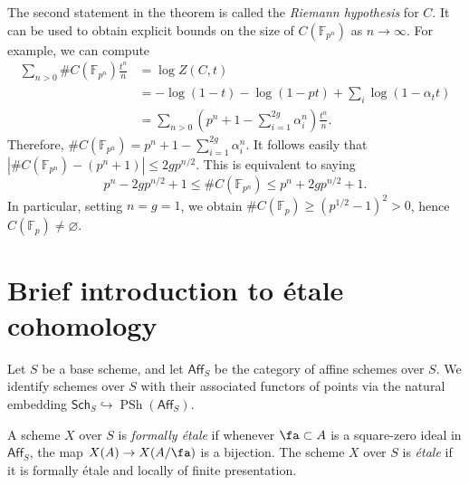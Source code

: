 \documentclass{article}
\begin{document}
The second statement in the theorem is called the \emph{Riemann hypothesis} 
for $C$. It can be used to obtain explicit bounds on the size of 
$C(\mathbb{F}_{p^n})$ as $n\to\infty$. For example, we can compute 
\begin{align*}
  \sum_{n>0} \# C(\mathbb{F}_{p^n}) \frac{t^n}{n} 
    &= \log Z(C,t) \\
    &= -\log(1-t) - \log(1-p t) + \sum_i \log(1-\alpha_t t) \\
    &= \sum_{n>0} \left(p^n+1-\sum_{i=1}^{2 g} \alpha_i^n\right) \frac{t^n}{n} \text{.}
\end{align*}
Therefore, $\# C(\mathbb{F}_{p^n}) = p^n+1-\sum_{i=1}^{2 g} \alpha_i^n$. It 
follows easily that $|\# C(\mathbb{F}_{p^n})-(p^n+1)| \leqslant 2 g p^{n/2}$. 
This is equivalent to saying 
\[
  p^n-2 g p^{n/2}+1 
    \leqslant \# C(\mathbb{F}_{p^n}) 
    \leqslant p^n + 2 g p^{n/2} + 1 \text{.}
\]
In particular, setting $n = g = 1$, we obtain 
$\# C(\mathbb{F}_p) \geqslant (p^{1/2}-1)^2>0$, hence 
$C(\mathbb{F}_p)\ne\varnothing$. 

























\appendix
\section{Brief introduction to \'etale cohomology}





Let $S$ be a base scheme, and let $\mathsf{Aff}_S$ be the category of 
affine schemes over $S$. We identify schemes over $S$ with their associated 
functors of points via the natural embedding 
$\mathsf{Sch}_S \hookrightarrow \operatorname{PSh}(\mathsf{Aff}_S)$. 

\begin{definition}
A scheme $X$ over $S$ is \emph{formally \'etale} if whenever 
$\fa\subset A$ is a square-zero ideal in $\mathsf{Aff}_S$, the map 
$X(A) \to X(A/\fa)$ is a bijection. 
The scheme $X$ over $S$ is \emph{\'etale} if it is formally \'etale and 
locally of finite presentation. 
\end{definition}
\end{document}

